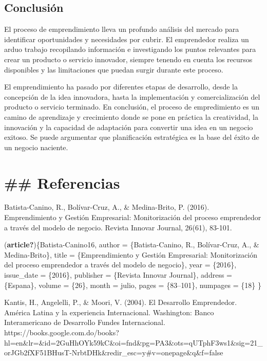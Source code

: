 \documentclass[
  letterpaper,
  DIV=11,
  numbers=noendperiod]{scrreprt}
\begin{document}
\hypertarget{conclusiuxf3n}{%
\section{Conclusión}\label{conclusiuxf3n}}

El proceso de emprendimiento lleva un profundo análisis del mercado para
identificar oportunidades y necesidades por cubrir. El emprendedor
realiza un arduo trabajo recopilando información e investigando los
puntos relevantes para crear un producto o servicio innovador, siempre
tenendo en cuenta los recursos disponibles y las limitaciones que puedan
surgir durante este proceso.

El emprendimiento ha pasado por diferentes etapas de desarrollo, desde
la concepción de la idea innovadora, hasta la implementación y
comercialización del producto o servicio terminado. En conclusión, el
proceso de empredimiento es un camino de aprendizaje y crecimiento donde
se pone en práctica la creatividad, la innovación y la capacidad de
adaptación para convertir una idea en un negocio exitoso. Se puede
argumentar que planificación estratégica es la base del éxito de un
negocio naciente.


\hypertarget{referencias-1}{%
\chapter{\#\# Referencias}\label{referencias-1}}

Batista-Canino, R., Bolívar-Cruz, A., \& Medina-Brito, P. (2016).
Emprendimiento y Gestión Empresarial: Monitorización del proceso
emprendedor a través del modelo de negocio. Revista Innovar Journal,
26(61), 83-101.

(\textbf{article?})\{Batista-Canino16, author = \{Batista-Canino, R.,
Bolívar-Cruz, A., \& Medina-Brito\}, title = \{Emprendimiento y Gestión
Empresarial: Monitorización del proceso emprendedor a través del modelo
de negocio\}, year = \{2016\}, issue\_date = \{2016\}, publisher =
\{Revista Innovar Journal\}, address = \{Espana\}, volume = \{26\},
month = julio, pages = \{83--101\}, numpages = \{18\} \}

Kantis, H., Angelelli, P., \& Moori, V. (2004). El Desarrollo
Emprendedor. América Latina y la experiencia Internacional. Washington:
Banco Interamericano de Desarrollo Fundes Internacional.
https://books.google.com.do/books?hl=en\&lr=\&id=2GuHhOYk59kC\&oi=fnd\&pg=PA3\&ots=qUTphF3ws1\&sig=21\_orJGb2fXF51BHusT-NrbtDHk\&redir\_esc=y\#v=onepage\&q\&f=false
\end{document}
